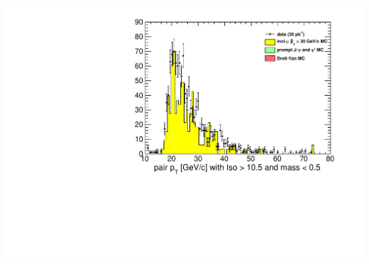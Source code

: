 \documentclass[compress]{beamer}
\begin{document}
\begin{frame}
\begin{columns}
\includegraphics[width=\linewidth]{lowdimuon_pt_lowmass_noniso.pdf}
\end{columns}
\end{frame}
\end{document}

